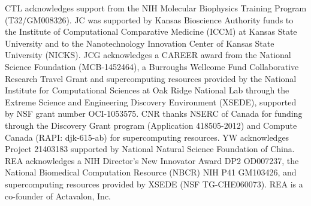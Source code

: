\par CTL acknowledges support from the NIH Molecular Biophysics Training Program (T32\-/GM008326).  JC was supported by Kansas Bioscience Authority funds to the Institute of Computational Comparative Medicine (ICCM) at Kansas State University and to the Nanotechnology Innovation Center of Kansas State University (NICKS).  JCG acknowledges a CAREER award from the National Science Foundation (MCB-1452464), a Burroughs Wellcome Fund Collaborative Research Travel Grant and supercomputing resources provided by the National Institute for Computational Sciences at Oak Ridge National Lab through the Extreme Science and Engineering Discovery Environment (XSEDE), supported by NSF grant number OCI-1053575.  CNR thanks NSERC of Canada for funding through the Discovery Grant program (Application 418505-2012) and Compute Canada (RAPI: djk-615-ab) for supercomputing resources.  YW acknowledges Project 21403183 supported by National Natural Science Foundation of China.  REA acknowledges a NIH Director's New Innovator Award DP2 OD007237, the National Biomedical Computation Resource (NBCR) NIH P41 GM103426, and supercomputing resources provided by XSEDE (NSF TG-CHE060073).  REA is a co-founder of Actavalon, Inc.
